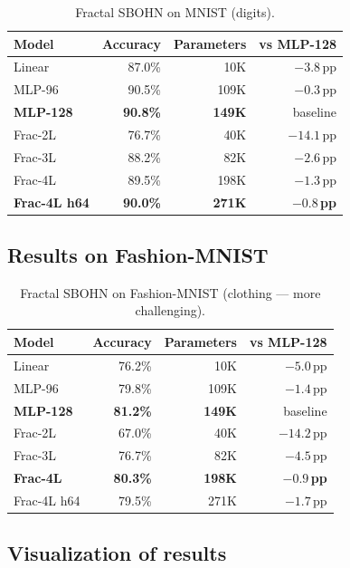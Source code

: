 \documentclass[11pt,a4paper]{report}
\begin{document}
\begin{table}[h]
\centering
\caption{Fractal SBOHN on MNIST (digits).}
\begin{tabular}{l r r r}
\hline
Model & Accuracy & Parameters & vs MLP-128 \\
\hline
Linear & 87.0\% & 10K & $-3.8$\,pp \\
MLP-96 & 90.5\% & 109K & $-0.3$\,pp \\
\textbf{MLP-128} & \textbf{90.8\%} & \textbf{149K} & baseline \\
Frac-2L & 76.7\% & 40K & $-14.1$\,pp \\
Frac-3L & 88.2\% & 82K & $-2.6$\,pp \\
Frac-4L & 89.5\% & 198K & $-1.3$\,pp \\
\textbf{Frac-4L h64} & \textbf{90.0\%} & \textbf{271K} & $\mathbf{-0.8}$\,\textbf{pp} \\
\hline
\end{tabular}
\end{table}

\subsection{Results on Fashion-MNIST}

\begin{table}[h]
\centering
\caption{Fractal SBOHN on Fashion-MNIST (clothing --- more challenging).}
\begin{tabular}{l r r r}
\hline
Model & Accuracy & Parameters & vs MLP-128 \\
\hline
Linear & 76.2\% & 10K & $-5.0$\,pp \\
MLP-96 & 79.8\% & 109K & $-1.4$\,pp \\
\textbf{MLP-128} & \textbf{81.2\%} & \textbf{149K} & baseline \\
Frac-2L & 67.0\% & 40K & $-14.2$\,pp \\
Frac-3L & 76.7\% & 82K & $-4.5$\,pp \\
\textbf{Frac-4L} & \textbf{80.3\%} & \textbf{198K} & $\mathbf{-0.9}$\,\textbf{pp} \\
Frac-4L h64 & 79.5\% & 271K & $-1.7$\,pp \\
\hline
\end{tabular}
\end{table}

\subsection{Visualization of results}
\end{document}
